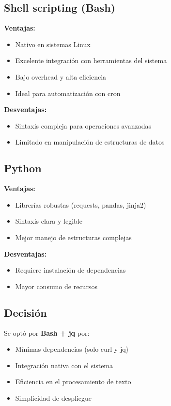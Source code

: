 \subsection{Shell scripting (Bash)}

\textbf{Ventajas:}
\begin{itemize}
  \item Nativo en sistemas Linux
  \item Excelente integración con herramientas del sistema
  \item Bajo overhead y alta eficiencia
  \item Ideal para automatización con cron
\end{itemize}

\textbf{Desventajas:}
\begin{itemize}
  \item Sintaxis compleja para operaciones avanzadas
  \item Limitado en manipulación de estructuras de datos
\end{itemize}

\subsection{Python}

\textbf{Ventajas:}
\begin{itemize}
  \item Librerías robustas (requests, pandas, jinja2)
  \item Sintaxis clara y legible
  \item Mejor manejo de estructuras complejas
\end{itemize}

\textbf{Desventajas:}
\begin{itemize}
  \item Requiere instalación de dependencias
  \item Mayor consumo de recursos
\end{itemize}

\subsection{Decisión}

Se optó por \textbf{Bash + jq} por:
\begin{itemize}
  \item Mínimas dependencias (solo curl y jq)
  \item Integración nativa con el sistema
  \item Eficiencia en el procesamiento de texto
  \item Simplicidad de despliegue
\end{itemize}

